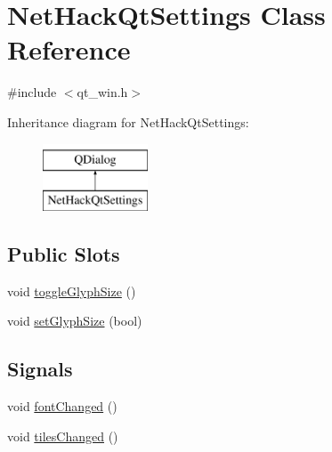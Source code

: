 \hypertarget{classNetHackQtSettings}{\section{Net\+Hack\+Qt\+Settings Class Reference}
\label{classNetHackQtSettings}
}


{\ttfamily \#include $<$qt\+\_\+win.\+h$>$}

Inheritance diagram for Net\+Hack\+Qt\+Settings\+:\begin{figure}[H]
\begin{center}
\leavevmode
\includegraphics[height=2.000000cm]{classNetHackQtSettings}
\end{center}
\end{figure}
\subsection*{Public Slots}
\begin{DoxyCompactItemize}
\item 
void \hyperlink{classNetHackQtSettings_ab18a40f74dd935c1b6dfb0e2538a00b6}{toggle\+Glyph\+Size} ()
\item 
void \hyperlink{classNetHackQtSettings_af0134d7c8665f58a817bca7c1e526349}{set\+Glyph\+Size} (bool)
\end{DoxyCompactItemize}
\subsection*{Signals}
\begin{DoxyCompactItemize}
\item 
void \hyperlink{classNetHackQtSettings_aedc85873ee6f9ebe70109bceba4dab41}{font\+Changed} ()
\item 
void \hyperlink{classNetHackQtSettings_a4c70e966e186b525ccde941717967a12}{tiles\+Changed} ()
\end{DoxyCompactItemize}
